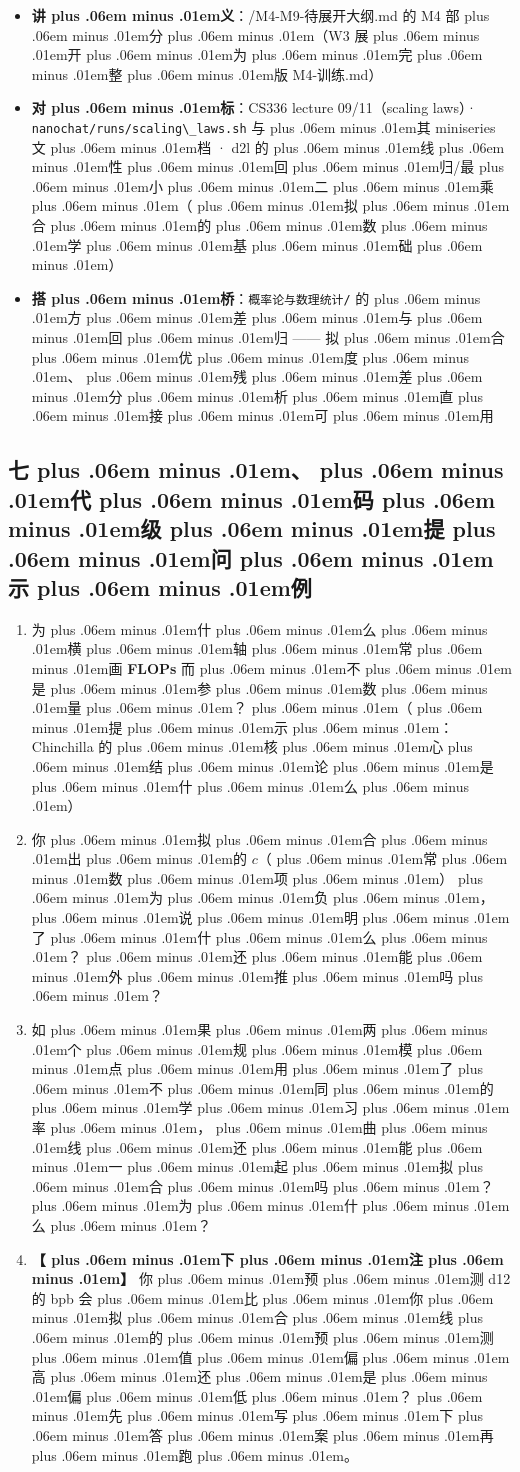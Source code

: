 \documentclass[
]{article}
\newcommand{\passthrough}[1]{#1}
\providecommand{\tightlist}{%
  \setlength{\itemsep}{0pt}\setlength{\parskip}{0pt}}
\def\zh#1{{\zhfont #1}}
\def\sym#1{{\symfont #1}}
\def\codezh#1{{\zhmonofont #1}}
\def\zhglue{\hskip0pt plus .06em minus .01em}
\begin{document}
\begin{itemize}
\tightlist
\item
  \textbf{\zh{讲\zhglue 义}}\zh{：}\passthrough{\codezh{{\zh{讲}}{\zh{义}}/M4-M9-{\zh{待}}{\zh{展}}{\zh{开}}{\zh{大}}{\zh{纲}}.md}} \zh{的} M4 \zh{部\zhglue 分\zhglue （}W3 \zh{展\zhglue 开\zhglue 为\zhglue 完\zhglue 整\zhglue 版} \passthrough{\codezh{M4-{\zh{训}}{\zh{练}}.md}}\zh{）}
\item
  \textbf{\zh{对\zhglue 标}}\zh{：}CS336 lecture 09/11\zh{（}scaling laws\zh{）}\sym{·} \passthrough{\lstinline!nanochat/runs/scaling\_laws.sh!} \zh{与\zhglue 其} miniseries \zh{文\zhglue 档} \sym{·} d2l \zh{的\zhglue 线\zhglue 性\zhglue 回\zhglue 归}/\zh{最\zhglue 小\zhglue 二\zhglue 乘\zhglue （\zhglue 拟\zhglue 合\zhglue 的\zhglue 数\zhglue 学\zhglue 基\zhglue 础\zhglue ）}
\item
  \textbf{\zh{搭\zhglue 桥}}\zh{：}\passthrough{\lstinline!概率论与数理统计/!} \zh{的\zhglue 方\zhglue 差\zhglue 与\zhglue 回\zhglue 归} ------ \zh{拟\zhglue 合\zhglue 优\zhglue 度\zhglue 、\zhglue 残\zhglue 差\zhglue 分\zhglue 析\zhglue 直\zhglue 接\zhglue 可\zhglue 用}
\end{itemize}

\subsection{\zh{七\zhglue 、\zhglue 代\zhglue 码\zhglue 级\zhglue 提\zhglue 问\zhglue 示\zhglue 例}}\label{ux4e03ux4ee3ux7801ux7ea7ux63d0ux95eeux793aux4f8b}

\begin{enumerate}
\def\labelenumi{\arabic{enumi}.}
\tightlist
\item
  \zh{为\zhglue 什\zhglue 么\zhglue 横\zhglue 轴\zhglue 常\zhglue 画} \textbf{FLOPs} \zh{而\zhglue 不\zhglue 是\zhglue 参\zhglue 数\zhglue 量\zhglue ？\zhglue （\zhglue 提\zhglue 示\zhglue ：}Chinchilla \zh{的\zhglue 核\zhglue 心\zhglue 结\zhglue 论\zhglue 是\zhglue 什\zhglue 么\zhglue ）}
\item
  \zh{你\zhglue 拟\zhglue 合\zhglue 出\zhglue 的} \(c\)\zh{（\zhglue 常\zhglue 数\zhglue 项\zhglue ）\zhglue 为\zhglue 负\zhglue ，\zhglue 说\zhglue 明\zhglue 了\zhglue 什\zhglue 么\zhglue ？\zhglue 还\zhglue 能\zhglue 外\zhglue 推\zhglue 吗\zhglue ？}
\item
  \zh{如\zhglue 果\zhglue 两\zhglue 个\zhglue 规\zhglue 模\zhglue 点\zhglue 用\zhglue 了\zhglue 不\zhglue 同\zhglue 的\zhglue 学\zhglue 习\zhglue 率\zhglue ，\zhglue 曲\zhglue 线\zhglue 还\zhglue 能\zhglue 一\zhglue 起\zhglue 拟\zhglue 合\zhglue 吗\zhglue ？\zhglue 为\zhglue 什\zhglue 么\zhglue ？}
\item
  \textbf{\zh{【\zhglue 下\zhglue 注\zhglue 】}} \zh{你\zhglue 预\zhglue 测} d12 \zh{的} bpb \zh{会\zhglue 比\zhglue 你\zhglue 拟\zhglue 合\zhglue 线\zhglue 的\zhglue 预\zhglue 测\zhglue 值\zhglue 偏\zhglue 高\zhglue 还\zhglue 是\zhglue 偏\zhglue 低\zhglue ？\zhglue 先\zhglue 写\zhglue 下\zhglue 答\zhglue 案\zhglue 再\zhglue 跑\zhglue 。}
\end{enumerate}
\end{document}

